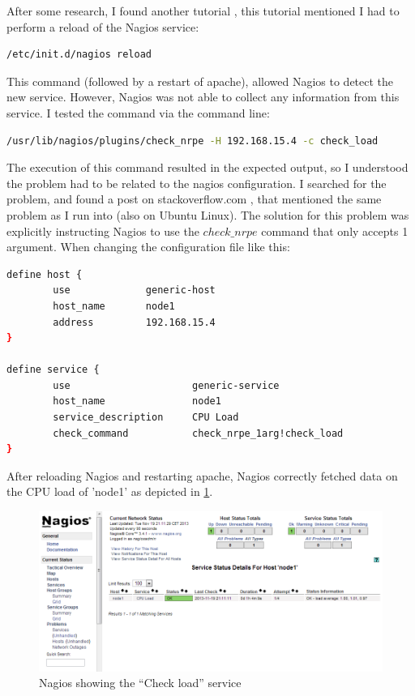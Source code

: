 \documentclass[12pt]{report}
\begin{document}
After some research, I found another tutorial
\cite{nrpe_config_tutorial},
this tutorial mentioned I had to perform a reload of the Nagios
service:
\begin{lstlisting}[language=bash]
  /etc/init.d/nagios reload 
\end{lstlisting} 
This command (followed by a restart of apache), allowed Nagios to
detect the new service.
However, Nagios was not able to collect any information from this
service. I tested the command via the command line:
\begin{lstlisting}[language=bash]
  /usr/lib/nagios/plugins/check_nrpe -H 192.168.15.4 -c check_load
\end{lstlisting} 
The execution of this command resulted in the expected output, 
so I understood the problem had to be related to the nagios
configuration.
I searched for the problem, and found a post on stackoverflow.com
\cite{stackoverflow_nagios},
that mentioned the same problem as I run into (also on Ubuntu Linux). 
The solution for this problem was explicitly instructing Nagios to
use the $check\_nrpe$ command that only accepts 1 argument.
When changing the configuration file like this:
\begin{lstlisting}[language=bash]
define host {
        use             generic-host
        host_name       node1
        address         192.168.15.4
}

define service {
        use                     generic-service
        host_name               node1
        service_description     CPU Load
        check_command           check_nrpe_1arg!check_load
}
\end{lstlisting}
After reloading Nagios and restarting apache, Nagios correctly fetched data
on the CPU load of 'node1' as depicted in
\cref{fig:nagios_nrpe_working_check_load}.

\begin{figure}[h!]
  \caption{Nagios showing the ``Check load'' service}
  \label{fig:nagios_nrpe_working_check_load}
  \centering
    \includegraphics[scale=0.3]{pics/nagios_2.png}
\end{figure}
\end{document}
